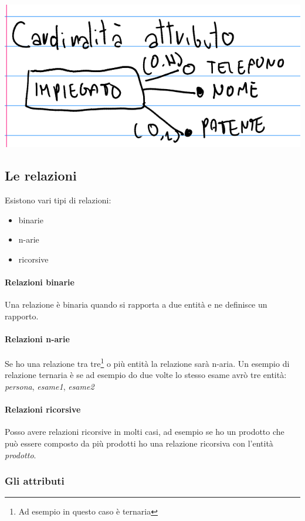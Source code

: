 \includegraphics[]{img/cardinalita_attributi.png}

\subsection{Le relazioni}

Esistono vari tipi di relazioni:
\begin{itemize}
    \item binarie
    \item n-arie
    \item ricorsive
\end{itemize}

\paragraph{Relazioni binarie} Una relazione è binaria quando si rapporta a due entità e ne definisce un rapporto.

\paragraph{Relazioni n-arie} Se ho una relazione tra tre\footnote{Ad esempio in questo caso è ternaria} o più entità la relazione sarà n-aria. Un esempio di relazione ternaria è se ad esempio do due volte lo stesso esame avrò tre entità: \textit{persona}, \textit{esame1}, \textit{esame2}

\paragraph{Relazioni ricorsive} Posso avere relazioni ricorsive in molti casi, ad esempio se ho un prodotto che può essere composto da più prodotti ho una relazione ricorsiva con l'entità \textit{prodotto}.

\subsubsection{Gli attributi}

